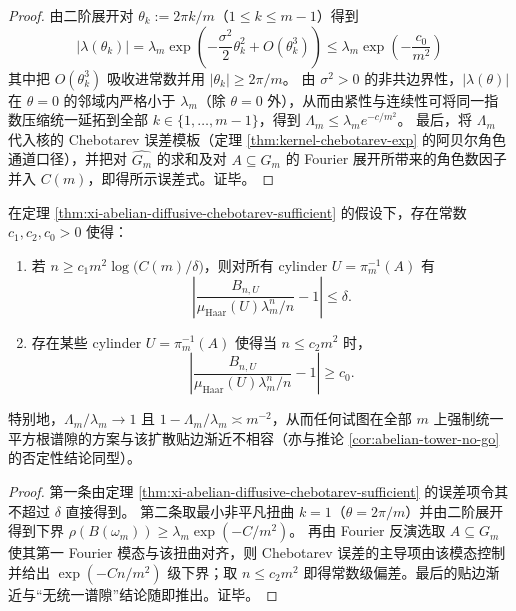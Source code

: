 \begin{proof}
由二阶展开对 \(\theta_k:=2\pi k/m\)（\(1\le k\le m-1\)）得到
\[
\bigl|\lambda(\theta_k)\bigr|
=\lambda_m\exp\!\left(-\frac{\sigma^2}{2}\theta_k^2+O(\theta_k^3)\right)
\le
\lambda_m\exp\!\left(-\frac{c_0}{m^2}\right)
\]
其中把 \(O(\theta_k^3)\) 吸收进常数并用 \(|\theta_k|\ge 2\pi/m\)。
由 \(\sigma^2>0\) 的非共边界性，\(|\lambda(\theta)|\) 在 \(\theta=0\) 的邻域内严格小于 \(\lambda_m\)（除 \(\theta=0\) 外），从而由紧性与连续性可将同一指数压缩统一延拓到全部 \(k\in\{1,\dots,m-1\}\)，得到 \(\Lambda_m\le \lambda_m e^{-c/m^2}\)。
最后，将 \(\Lambda_m\) 代入核的 Chebotarev 误差模板（定理 \ref{thm:kernel-chebotarev-exp} 的阿贝尔角色通道口径），并把对 \(\widehat{G_m}\) 的求和及对 \(A\subseteq G_m\) 的 Fourier 展开所带来的角色数因子并入 \(C(m)\)，即得所示误差式。证毕。
\end{proof}

\begin{corollary}\label{cor:xi-diffusive-m2-barrier-sampling}
在定理 \ref{thm:xi-abelian-diffusive-chebotarev-sufficient} 的假设下，存在常数 \(c_1,c_2,c_0>0\) 使得：
\begin{enumerate}
  \item 若 \(n\ge c_1 m^2\log\!\bigl(C(m)/\delta\bigr)\)，则对所有 cylinder \(U=\pi_m^{-1}(A)\) 有
  \[
  \left|
  \frac{B_{n,U}}{\mu_{\mathrm{Haar}}(U)\lambda_m^n/n}-1
  \right|
  \le \delta.
  \]
  \item 存在某些 cylinder \(U=\pi_m^{-1}(A)\) 使得当 \(n\le c_2 m^2\) 时，
  \[
  \left|
  \frac{B_{n,U}}{\mu_{\mathrm{Haar}}(U)\lambda_m^n/n}-1
  \right|
  \ge c_0.
  \]
\end{enumerate}
特别地，\(\Lambda_m/\lambda_m\to 1\) 且 \(1-\Lambda_m/\lambda_m\asymp m^{-2}\)，从而任何试图在全部 \(m\) 上强制统一平方根谱隙的方案与该扩散贴边渐近不相容（亦与推论 \ref{cor:abelian-tower-no-go} 的否定性结论同型）。
\end{corollary}

\begin{proof}
第一条由定理 \ref{thm:xi-abelian-diffusive-chebotarev-sufficient} 的误差项令其不超过 \(\delta\) 直接得到。
第二条取最小非平凡扭曲 \(k=1\)（\(\theta=2\pi/m\)）并由二阶展开得到下界
\(
\rho(B(\omega_m))\ge \lambda_m\exp(-C/m^2)
\)。
再由 Fourier 反演选取 \(A\subseteq G_m\) 使其第一 Fourier 模态与该扭曲对齐，则 Chebotarev 误差的主导项由该模态控制并给出 \(\exp(-C n/m^2)\) 级下界；取 \(n\le c_2 m^2\) 即得常数级偏差。最后的贴边渐近与“无统一谱隙”结论随即推出。证毕。
\end{proof}

